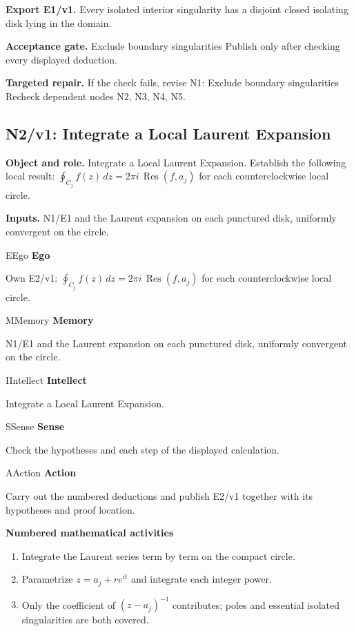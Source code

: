 \documentclass[preprint,12pt,aps,pra,showkeys,amsmath,amssymb,superscriptaddress,floatfix]{revtex4-2}
\theoremstyle{definition}
\theoremstyle{remark}
\newcommand{\mmfaculty}[3]{%
 \begin{mmfacultybox}{#1}{#2}
 {\sffamily\bfseries\color{MMBlue}#2}\par\smallskip #3
 \end{mmfacultybox}}
\newcommand{\field}[2]{\par\smallskip\noindent\textbf{#1.} #2\par}
\begin{document}
\field{Export E1/v1}{Every isolated interior singularity has a disjoint closed isolating disk
lying in the domain.}

\field{Acceptance gate}{Exclude boundary singularities Publish only after checking every
displayed deduction.}

\field{Targeted repair}{If the check fails, revise N1: Exclude boundary singularities Recheck
dependent nodes N2, N3, N4, N5.}

\clearpage

\subsection{N2/v1: Integrate a Local Laurent Expansion}

\field{Object and role}{Integrate a Local Laurent Expansion. Establish the following local
result: \(\oint_{C_j}f(z)\,dz=2\pi i\,\operatorname{Res}(f,a_j)\) for
each counterclockwise local circle.}

\field{Inputs}{N1/E1 and the Laurent expansion on each punctured disk, uniformly
convergent on the circle.}

\mmfaculty{E}{Ego}{Own E2/v1: \(\oint_{C_j}f(z)\,dz=2\pi i\,\operatorname{Res}(f,a_j)\) for
each counterclockwise local circle.}

\mmfaculty{M}{Memory}{N1/E1 and the Laurent expansion on each punctured disk, uniformly
convergent on the circle.}

\mmfaculty{I}{Intellect}{Integrate a Local Laurent Expansion.}

\mmfaculty{S}{Sense}{Check the hypotheses and each step of the displayed calculation.}

\mmfaculty{A}{Action}{Carry out the numbered deductions and publish E2/v1 together with its
hypotheses and proof location.}

\smallskip\noindent\textbf{Numbered mathematical activities}

\begin{enumerate}[label=N2.\arabic*,leftmargin=3.4em]

\item Integrate the Laurent series term by term on the compact circle.

\item Parametrize \(z=a_j+r e^{it}\) and integrate each integer power.

\item Only the coefficient of \((z-a_j)^{-1}\) contributes; poles and
essential isolated singularities are both covered.

\end{enumerate}
\end{document}
